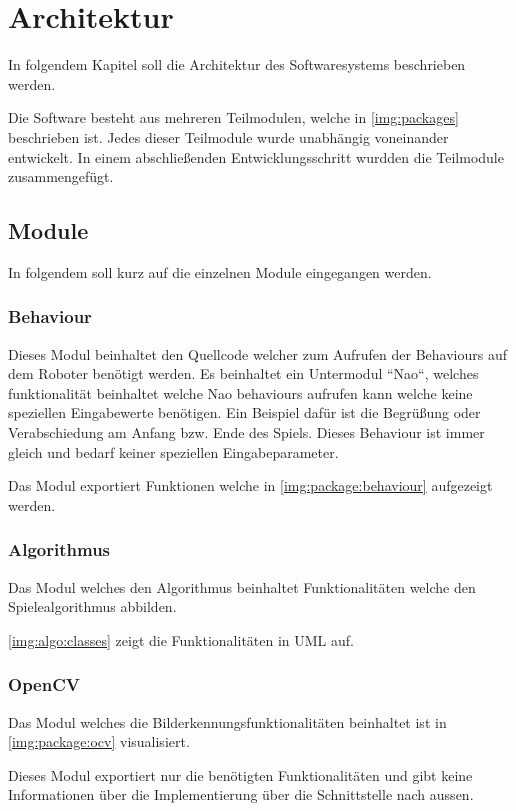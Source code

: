 \chapter{Architektur}

    In folgendem Kapitel soll die Architektur des Softwaresystems beschrieben
    werden.

    Die Software besteht aus mehreren Teilmodulen, welche in
    \autoref{img:packages} beschrieben ist.
    Jedes dieser Teilmodule wurde unabhängig voneinander entwickelt. In einem
    abschließenden Entwicklungsschritt wurdden die Teilmodule zusammengefügt.

    \section{Module}

        In folgendem soll kurz auf die einzelnen Module eingegangen werden.

        \subsection{Behaviour}

            Dieses Modul beinhaltet den Quellcode welcher zum Aufrufen der
            Behaviours auf dem Roboter benötigt werden.
            Es beinhaltet ein Untermodul ``Nao``, welches funktionalität
            beinhaltet welche Nao behaviours aufrufen kann welche keine
            speziellen Eingabewerte benötigen.
            Ein Beispiel dafür ist die Begrüßung oder Verabschiedung am Anfang
            bzw. Ende des Spiels.
            Dieses Behaviour ist immer gleich und bedarf keiner speziellen
            Eingabeparameter.

            Das Modul exportiert Funktionen welche in
            \autoref{img:package:behaviour} aufgezeigt werden.

        \subsection{Algorithmus}

            Das Modul welches den Algorithmus beinhaltet Funktionalitäten welche
            den Spielealgorithmus abbilden.

            \autoref{img:algo:classes} zeigt die Funktionalitäten in UML auf.

        \subsection{OpenCV}

            Das Modul welches die Bilderkennungsfunktionalitäten beinhaltet ist
            in \autoref{img:package:ocv} visualisiert.

            Dieses Modul exportiert nur die benötigten Funktionalitäten und gibt
            keine Informationen über die Implementierung über die Schnittstelle
            nach aussen.

